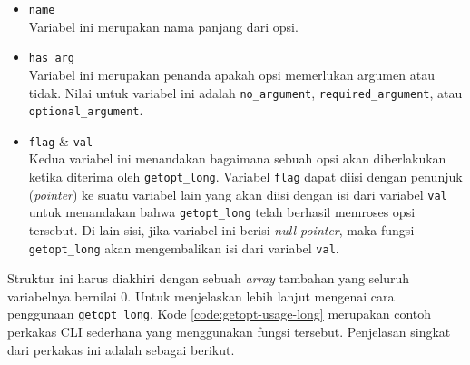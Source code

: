 \begin{itemize}
	\item \verb|name|\\
	Variabel ini merupakan nama panjang dari opsi.
	\item \verb|has_arg|\\
	Variabel ini merupakan penanda apakah opsi memerlukan argumen atau tidak. Nilai untuk variabel ini adalah \verb|no_argument|, \verb|required_argument|, atau \verb|optional_argument|.
	\item \verb|flag| \& \verb|val|\\ 
	Kedua variabel ini menandakan bagaimana sebuah opsi akan diberlakukan ketika diterima oleh \verb|getopt_long|. Variabel \verb|flag| dapat diisi dengan penunjuk (\textit{pointer}) ke suatu variabel lain yang akan diisi dengan isi dari variabel \verb|val| untuk menandakan bahwa \verb|getopt_long| telah berhasil memroses opsi tersebut. Di lain sisi, jika variabel ini berisi \textit{null pointer}, maka fungsi \verb|getopt_long| akan mengembalikan isi dari variabel \verb|val|.
\end{itemize}
\noindent
Struktur ini harus diakhiri dengan sebuah \textit{array} tambahan yang seluruh variabelnya bernilai 0.
\newline\newline %
Untuk menjelaskan lebih lanjut mengenai cara penggunaan \verb|getopt_long|, Kode \ref{code:getopt-usage-long} \mbox{merupakan} contoh perkakas CLI sederhana yang menggunakan fungsi tersebut. Penjelasan singkat dari perkakas ini adalah sebagai berikut.

